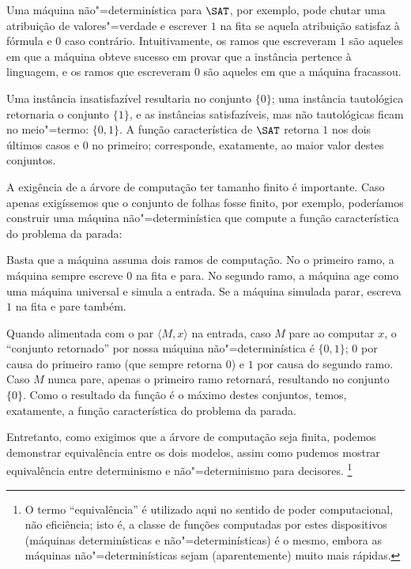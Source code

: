Uma máquina não"=determinística para $\SAT$,
por exemplo,
pode chutar uma atribuição de valores"=verdade
e escrever $1$ na fita se aquela atribuição satisfaz à fórmula
e $0$ caso contrário.
Intuitivamente, os ramos que escreveram $1$ são aqueles em que
a máquina obteve sucesso em provar que a instância pertence à linguagem,
e os ramos que escreveram $0$ são aqueles em que a máquina fracassou.

Uma instância insatisfazível resultaria no conjunto $\{0\}$;
uma instância tautológica retornaria o conjunto $\{1\}$,
e as instâncias satisfazíveis, mas não tautológicas
ficam no meio"=termo: $\{0, 1\}$.
A função característica de $\SAT$ retorna $1$ nos dois últimos casos
e $0$ no primeiro;
corresponde, exatamente,
ao maior valor destes conjuntos.

A exigência de a árvore de computação ter tamanho finito é importante.
Caso apenas exigíssemos que o conjunto de folhas fosse finito, por exemplo,
poderíamos construir uma máquina não"=determinística
que compute a função característica do problema da parada:

Basta que a máquina assuma dois ramos de computação.
No o primeiro ramo, a máquina sempre escreve $0$ na fita e para.
No segundo ramo,
a máquina age como uma máquina universal e simula a entrada.
Se a máquina simulada parar, escreva $1$ na fita e pare também.

Quando alimentada com o par $\langle M, x \rangle$ na entrada,
caso $M$ pare ao computar $x$,
o ``conjunto retornado'' por nossa máquina não"=determinística é $\{0, 1\}$;
$0$ por causa do primeiro ramo (que sempre retorna $0$)
e $1$ por causa do segundo ramo.
Caso $M$ nunca pare, apenas o primeiro ramo retornará,
resultando no conjunto $\{0\}$.
Como o resultado da função é o máximo destes conjuntos,
temos, exatamente,
a função característica do problema da parada.

Entretanto, como exigimos que a árvore de computação seja finita,
podemos demonstrar equivalência entre os dois modelos,
assim como pudemos mostrar equivalência entre determinismo e não"=determinismo
para decisores.%
\footnote{
    O termo ``equivalência'' é utilizado aqui no sentido de poder computacional,
    não eficiência;
    isto é, a classe de funções computadas por estes dispositivos
    (máquinas determinísticas e não"=determinísticas)
    é o mesmo,
    embora as máquinas não"=determinísticas sejam (aparentemente)
    muito mais rápidas.
}


